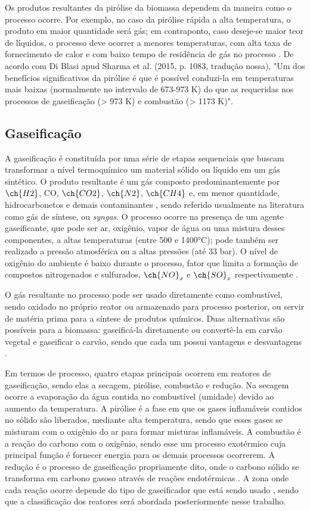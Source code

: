 Os produtos resultantes da pirólise da biomassa dependem da maneira como o processo ocorre. Por exemplo, no caso da pirólise rápida a alta temperatura, o produto em maior quantidade será gás; em contraponto, caso deseje-se maior teor de líquidos, o processo deve ocorrer a menores temperaturas, com alta taxa de fornecimento de calor e com baixo tempo de residência de gás no processo \cite{Singh}. De acordo com Di Blasi apud Sharma et al. (2015, p. 1083, tradução nossa), "Um dos benefícios significativos da pirólise é que é possível conduzi-la em temperaturas mais baixas (normalmente no intervalo de 673-973 K) do que as requeridas nos processos de gaseificação (> 973 K) e combustão (> 1173 K)".

\subsection{Gaseificação}

A gaseificação é constituída por uma série de etapas sequenciais que buscam transformar a nível termoquímico um material sólido ou líquido em um gás sintético. O produto resultante é um gás composto predominantemente por $\ch{H2}$, CO, $\ch{CO2}$, $\ch{N2}$, $\ch{CH4}$ e, em menor quantidade, hidrocarbonetos e demais contaminantes \cite{Nagafugi}, sendo referido usualmente na literatura como gás de síntese, ou \textit{syngas}. O processo ocorre na presença de um agente gaseificante, que pode ser ar, oxigênio, vapor de água ou uma mistura desses componentes, a altas temperaturas (entre 500 e 1400°C); pode também ser realizado a pressão atmosférica ou a altas pressões (até 33 bar). O nível de oxigênio do ambiente é baixo durante o processo, fator que limita a formação de compostos nitrogenados e sulfurados, $\ch{NO}_x$ e $\ch{SO}_x$ respectivamente \cite{Ismail2019}.

O gás resultante no processo pode ser usado diretamente como combustível, sendo oxidado no próprio reator ou armazenado para processo posterior, ou servir de matéria prima para a síntese de produtos químicos. Duas alternativas são possíveis para a biomassa: gaseificá-la diretamente ou convertê-la em carvão vegetal e gaseificar o carvão, sendo que cada um possui vantagens e desvantagens \cite{Brand}.

Em termos de processo, quatro etapas principais ocorrem em reatores de gaseificação, sendo elas a secagem, pirólise, combustão e redução. Na secagem ocorre a evaporação da água contida no combustível (umidade) devido ao aumento da temperatura. A pirólise é a fase em que os gases inflamáveis contidos no sólido são liberados, mediante alta temperatura, sendo que esses gases se misturam com o oxigênio do ar para formar misturas inflamáveis. A combustão é a reação do carbono com o oxigênio, sendo esse um processo exotérmico cuja principal função é fornecer energia para os demais processos ocorrerem. A redução é o processo de gaseificação propriamente dito, onde o carbono sólido se transforma em carbono gasoso através de reações endotérmicas \cite{Amazonia}. A zona onde cada reação ocorre depende do tipo de gaseificador que está sendo usado \cite{Kretti}, sendo que a classificação dos reatores será abordada posteriormente nesse trabalho.

